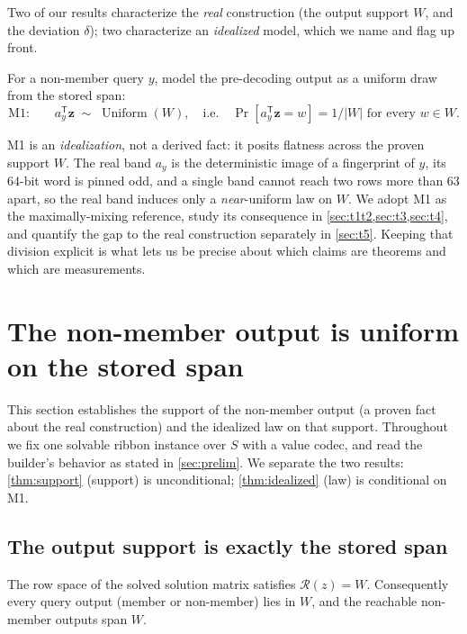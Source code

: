 \documentclass[acmsmall,review]{acmart}
\DeclareMathOperator{\Uniform}{Uniform}
\newcommand{\W}{W}                          %
\newcommand{\Rz}{\mathcal{R}(z)}            %
\newcommand{\bz}{\mathbf{z}}                %
\newcommand{\ay}{a_y}                       %
\begin{document}
Two of our results characterize the \emph{real} construction (the output support
$\W$, and the deviation $\delta$); two characterize an \emph{idealized} model, which
we name and flag up front.
\begin{definition}
\label{def:M1}
For a non-member query $y$, model the pre-decoding output as a uniform draw from the
stored span:
\[
  \text{M1:}\qquad \ay^{\mathsf T}\bz \;\sim\; \Uniform(\W),
  \quad\text{i.e.}\quad
  \Pr[\ay^{\mathsf T}\bz = w] = 1/|\W| \text{ for every } w \in \W.
\]
\end{definition}
M1 is an \emph{idealization}, not a derived fact: it posits flatness across the
proven support $\W$. The real band $\ay$ is the deterministic image of a fingerprint
of $y$, its $64$-bit word is pinned odd, and a single band cannot reach two rows more
than $63$ apart, so the real band induces only a \emph{near}-uniform law on $\W$.
We adopt M1 as the maximally-mixing reference, study its consequence in
\cref{sec:t1t2,sec:t3,sec:t4}, and quantify the gap to the real construction
separately in \cref{sec:t5}. Keeping that division explicit is what lets us be precise
about which claims are theorems and which are measurements.

\section{The non-member output is uniform on the stored span}
\label{sec:t1t2}

This section establishes the support of the non-member output (a proven fact about
the real construction) and the idealized law on that support. Throughout we fix one
solvable ribbon instance over $S$ with a value codec, and read the builder's behavior
as stated in \cref{sec:prelim}. We separate the two results: \cref{thm:support}
(support) is unconditional; \cref{thm:idealized} (law) is conditional on M1.

\subsection{The output support is exactly the stored span}

\begin{theorem}
\label{thm:support}
The row space of the solved solution matrix satisfies $\Rz = \W$. Consequently every
query output (member or non-member) lies in $\W$, and the reachable non-member outputs
span $\W$.
\end{theorem}
\end{document}
